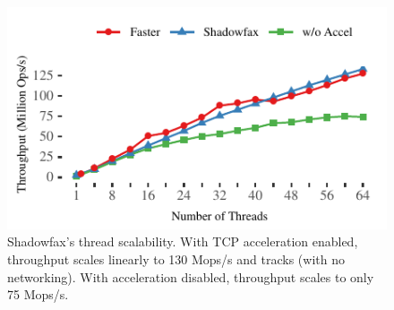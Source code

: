 \begin{figure}[t]
\centering
\includegraphics[width=0.9\columnwidth]{graphs/thread-scalability-tcp.pdf}
\caption{Shadowfax's thread scalability. With TCP acceleration enabled,
    throughput scales linearly to 130 Mops/s and tracks \faster (with no networking).
    With acceleration disabled, throughput scales to only 75 Mops/s.}
\label{fig:thread-scalability}
\end{figure}
